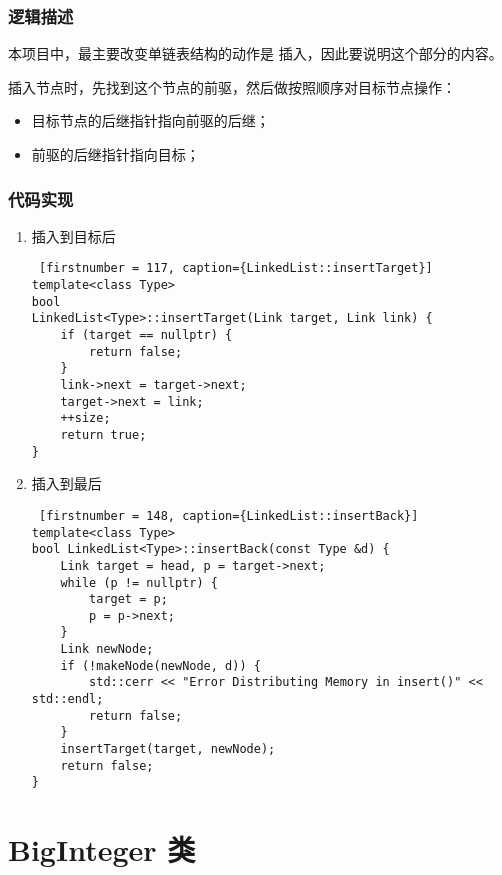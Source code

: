 \subsection{逻辑描述}


本项目中，最主要改变单链表结构的动作是 {\kaishu 插入}，因此要说明这个部分的内容。

插入节点时，先找到这个节点的前驱，然后做按照顺序对目标节点操作：

\begin{itemize}
    \item 目标节点的后继指针指向前驱的后继；
    \item 前驱的后继指针指向目标；
\end{itemize}


\subsection{代码实现}

{
\begin{enumerate}
      \item 插入到目标后
\begin{lstlisting} [firstnumber = 117, caption={LinkedList::insertTarget}]
template<class Type>
bool
LinkedList<Type>::insertTarget(Link target, Link link) {
    if (target == nullptr) {
        return false;
    }
    link->next = target->next;
    target->next = link;
    ++size;
    return true;
} \end{lstlisting}
      \item 插入到最后
\begin{lstlisting} [firstnumber = 148, caption={LinkedList::insertBack}]
template<class Type>
bool LinkedList<Type>::insertBack(const Type &d) {
    Link target = head, p = target->next;
    while (p != nullptr) {
        target = p;
        p = p->next;
    }
    Link newNode;
    if (!makeNode(newNode, d)) {
        std::cerr << "Error Distributing Memory in insert()" << std::endl;
        return false;
    }
    insertTarget(target, newNode);
    return false;
} \end{lstlisting}
      
\end{enumerate}
}

\chapter{BigInteger 类}

